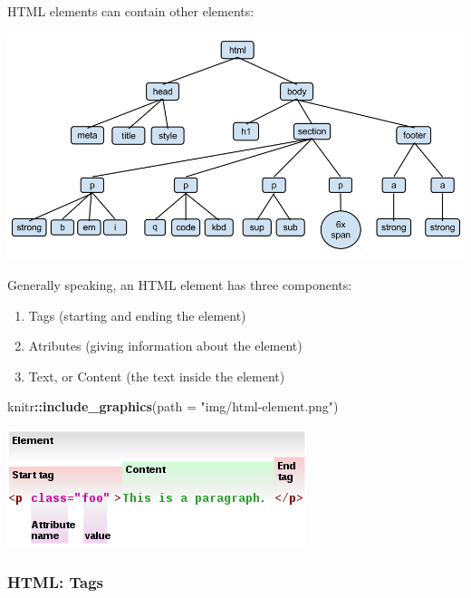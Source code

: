 \documentclass[]{book}
\newenvironment{Shaded}{\begin{snugshade}}{\end{snugshade}}
\newcommand{\KeywordTok}[1]{\textcolor[rgb]{0.13,0.29,0.53}{\textbf{#1}}}
\newcommand{\DataTypeTok}[1]{\textcolor[rgb]{0.13,0.29,0.53}{#1}}
\newcommand{\StringTok}[1]{\textcolor[rgb]{0.31,0.60,0.02}{#1}}
\newcommand{\OperatorTok}[1]{\textcolor[rgb]{0.81,0.36,0.00}{\textbf{#1}}}
\newcommand{\NormalTok}[1]{#1}
\providecommand{\tightlist}{%
  \setlength{\itemsep}{0pt}\setlength{\parskip}{0pt}}
\begin{document}
HTML elements can contain other elements:

\begin{center}\includegraphics[width=0.7\linewidth]{img/HTMLDOMTree} \end{center}

Generally speaking, an HTML element has three components:

\begin{enumerate}
\def\labelenumi{\arabic{enumi}.}
\tightlist
\item
  Tags (starting and ending the element)
\item
  Atributes (giving information about the element)
\item
  Text, or Content (the text inside the element)
\end{enumerate}

\begin{Shaded}
\begin{Highlighting}[]
\NormalTok{knitr}\OperatorTok{::}\KeywordTok{include_graphics}\NormalTok{(}\DataTypeTok{path =} \StringTok{"img/html-element.png"}\NormalTok{)}
\end{Highlighting}
\end{Shaded}

\begin{center}\includegraphics[width=0.7\linewidth]{img/html-element} \end{center}

\subsubsection*{HTML: Tags}\label{html-tags}
\end{document}
